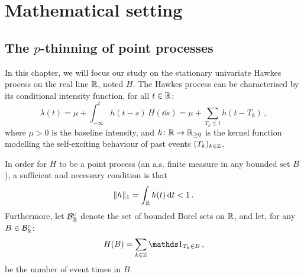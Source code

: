 
\section{Mathematical setting}\label{sec:chap5_mathsetting}

\subsection{The $p$-thinning of point processes}\label{sec:chap5_hawkesprocess}

In this chapter, we will focus our study on the stationary univariate Hawkes process on the real line ${\mathbb R}$, noted $H$.
The Hawkes process can be characterised by its conditional intensity function, for all $t\in{\mathbb R}$:
\begin{equation}\label{eq:chap5_hawkes_intensity}
    \lambda(t) = \mu + \int_{-\infty}^{t}{h(t-s)\,H(\dd s)} = \mu + \sum_{T_k \leq t}{h(t-T_k)}\,,
\end{equation}
where $\mu > 0$ is the baseline intensity, and $h\colon{\mathbb R}\to {\mathbb R}_{\geq 0}$ is the kernel function modelling the self-exciting behaviour of past events $(T_k)_{k\in{\mathbb Z}}$.

In order for $H$ to be a point process (\ie an a.s. finite measure in any bounded set $B$), 
a sufficient and necessary condition \parencite{Hawkes1971} is that 
\[\|h\|_1 = \int_{{\mathbb R}}{h(t)\,{\mathrm{d}} t} < 1\,.\]
Furthermore, let $\mathcal{B}_{{\mathbb R}}^c$ denote the set of bounded Borel sets on ${\mathbb R}$, and let, for any $B\in\mathcal{B}_{{\mathbb R}}^c$:
\[H(B) = \sum_{k\in\ZZ}{\II_{T_k \in B}}\,,\]
be the number of event times in $B$. 


